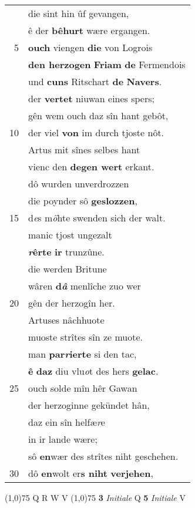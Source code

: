 \documentclass[8pt,a4paper,notitlepage]{article}
\begin{document}
\begin{table}[ht]
\begin{minipage}[t]{0.5\linewidth}
\begin{tabular}{rl}
 & die sint hin ûf gevangen,\\ 
 & ê der \textbf{bêhurt} wære ergangen.\\ 
5 & \textbf{ouch} viengen \textbf{die} von Logrois\\ 
 & \textbf{den herzogen} \textbf{Friam} \textbf{de} Fermendois\\ 
 & und \textbf{cuns} Ritschart \textbf{de} \textbf{Navers}.\\ 
 & der \textbf{vertet} niuwan eines spers;\\ 
 & gên wem ouch daz sîn hant gebôt,\\ 
10 & der viel \textbf{von} im durch tjoste nôt.\\ 
 & Artus mit sînes selbes hant\\ 
 & vienc den \textbf{degen wert} erkant.\\ 
 & dô wurden unverdrozzen\\ 
 & die poynder sô \textbf{geslozzen},\\ 
15 & d\textit{e}s m\textit{ö}hte swenden sich der walt.\\ 
 & manic tjost ungezalt\\ 
 & \textbf{\textit{r}êrte} \textbf{ir} trunzûne.\\ 
 & die werden Britune\\ 
 & wâren \textbf{d\textit{â}} menlîche zuo wer\\ 
20 & gên der herzogîn her.\\ 
 & Artuses nâchhuote\\ 
 & muoste strîtes sîn ze muote.\\ 
 & man \textbf{par\textit{r}ierte} si den tac,\\ 
 & \textbf{ê} \textbf{daz} diu vlu\textit{o}t des hers \textbf{gelac}.\\ 
25 & ouch solde mîn hêr Gawan\\ 
 & der herzoginne gekündet hân,\\ 
 & daz ein sîn helfæ\textit{r}e\\ 
 & in ir lande wære;\\ 
 & sô \textbf{en}wær des strîtes niht geschehen.\\ 
30 & dô \textbf{en}wolt er\textbf{s niht} \textbf{verjehen},\\ 
\end{tabular}
\scriptsize
\line(1,0){75} \newline
Q R W V \newline
\line(1,0){75} \newline
\textbf{3} \textit{Initiale} Q  \textbf{5} \textit{Initiale} V  \newline

\end{minipage}
\end{table}
\end{document}
